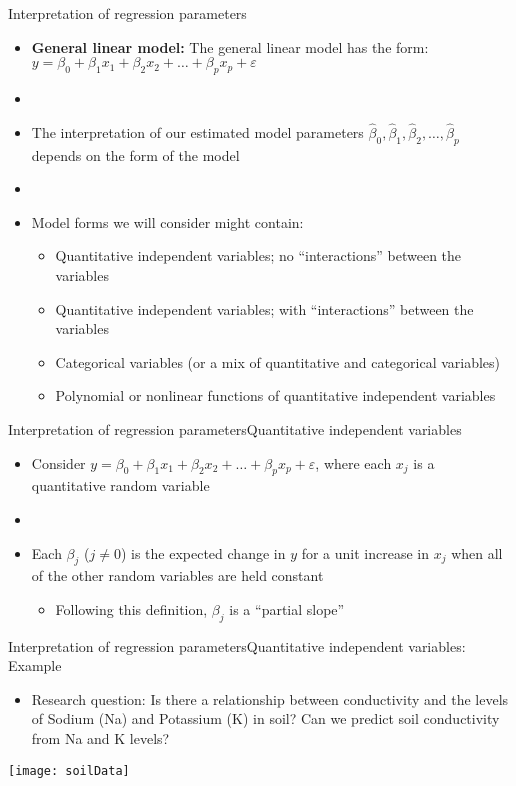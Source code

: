 \documentclass[xcolor=dvipsnames]{beamer}
\begin{document}
\begin{frame}{Interpretation of regression parameters}
	\begin{itemize}
		\item \textbf{General linear model:} The general linear model has the form: $y = \beta_0 + \beta_1 x_1 + \beta_2 x_2 + \hdots + \beta_p x_p + \varepsilon$
		\item[]
		\item The interpretation of our estimated model parameters $\hat{\beta}_0, \hat{\beta}_1, \hat{\beta}_2, \hdots, \hat{\beta}_p$ depends on the form of the model
		\item[]
		\item Model forms we will consider might contain:
		\begin{itemize}
			\item Quantitative independent variables; no ``interactions'' between the variables
			\item Quantitative independent variables; with ``interactions'' between the variables
			\item Categorical variables (or a mix of quantitative and categorical variables)
			\item Polynomial or nonlinear functions of quantitative independent variables
		\end{itemize}
	\end{itemize}
\end{frame}

\begin{frame}{Interpretation of regression parameters}{Quantitative independent variables}
	\begin{itemize}
		\item Consider $y = \beta_0 + \beta_1 x_1 + \beta_2 x_2 + \hdots + \beta_p x_p + \varepsilon$, where each $x_j$ is a quantitative random variable 
		\item[]
		\item Each $\beta_j$ ($j \neq 0$) is the expected change in $y$ for a unit increase in $x_j$ when all of the other random variables are held constant
		\begin{itemize}
			\item Following this definition, $\beta_j$ is a ``partial slope''
		\end{itemize}
	\end{itemize}
\end{frame}

\begin{frame}{Interpretation of regression parameters}{Quantitative independent variables: Example}
	\begin{itemize}
		\item Research question: Is there a relationship between conductivity and the levels of Sodium (Na) and Potassium (K) in soil? Can we predict soil conductivity from Na and K levels?
	\end{itemize}
	\begin{center}
		\texttt{[image: soilData]}
	\end{center}
\end{frame}
\end{document}
